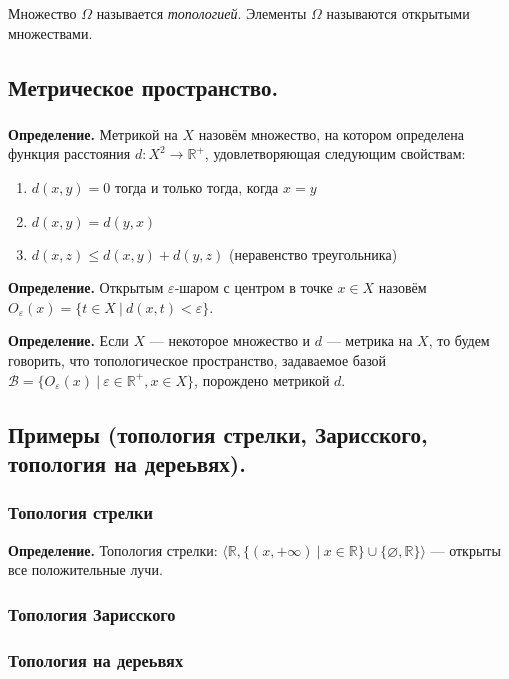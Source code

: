 \documentclass[10pt,a4paper,oneside]{article}
\begin{document}
Множество $\Omega$ называется \emph{топологией}.
Элементы $\Omega$ называются открытыми множествами.

\subsection{Метрическое пространство.}
\subsubsection{}
\noindent \textbf{ Определение. }
Метрикой на $X$ назовём множество, на котором определена функция расстояния $d: X^2 \rightarrow \mathbb{R}^+$, 
удовлетворяющая следующим свойствам:
\begin{enumerate}
\item $d(x,y) = 0$ тогда и только тогда, когда $x = y$
\item $d(x,y) = d(y,x)$
\item $d(x,z) \le d(x,y) + d(y,z)$ (неравенство треугольника)
\end{enumerate}

\noindent \textbf{ Определение. }
Открытым $\varepsilon$-шаром с центром в точке $x \in X$ назовём $O_\varepsilon(x) = \{ t \in X\ |\ d(x,t) < \varepsilon \}$.


\noindent \textbf{ Определение. }
Если $X$ --- некоторое множество и $d$ --- метрика на $X$, то будем говорить, что топологическое
пространство, задаваемое базой $\mathcal{B} = \{ O_\varepsilon(x)\ |\ \varepsilon \in \mathbb{R}^+, x \in X \}$,
порождено метрикой $d$.

\subsection{Примеры (топология стрелки, Зарисского, топология на дереьвях). }
\subsubsection{Топология стрелки}


\noindent \textbf{ Определение. } Топология стрелки: $\langle \mathbb{R}, \{(x,+\infty)\ |\ x\in\mathbb{R}\}\cup\{\varnothing,\mathbb{R}\}\rangle$ --- открыты все положительные лучи.


\subsubsection{Топология Зарисского}

\subsubsection{Топология на дереьвях}
\end{document}
